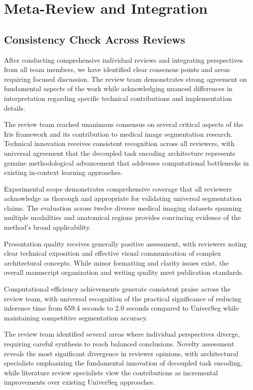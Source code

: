 \section*{Meta-Review and Integration}
\label{sec:meta_review}

\subsection*{Consistency Check Across Reviews}
After conducting comprehensive individual reviews and integrating perspectives from all team members, we have identified clear consensus points and areas requiring focused discussion. The review team demonstrates strong agreement on fundamental aspects of the work while acknowledging nuanced differences in interpretation regarding specific technical contributions and implementation details.

The review team reached unanimous consensus on several critical aspects of the Iris framework and its contribution to medical image segmentation research. Technical innovation receives consistent recognition across all reviewers, with universal agreement that the decoupled task encoding architecture represents genuine methodological advancement that addresses computational bottlenecks in existing in-context learning approaches.

Experimental scope demonstrates comprehensive coverage that all reviewers acknowledge as thorough and appropriate for validating universal segmentation claims. The evaluation across twelve diverse medical imaging datasets spanning multiple modalities and anatomical regions provides convincing evidence of the method's broad applicability.

Presentation quality receives generally positive assessment, with reviewers noting clear technical exposition and effective visual communication of complex architectural concepts. While minor formatting and clarity issues exist, the overall manuscript organization and writing quality meet publication standards.

Computational efficiency achievements generate consistent praise across the review team, with universal recognition of the practical significance of reducing inference time from 659.4 seconds to 2.0 seconds compared to UniverSeg while maintaining competitive segmentation accuracy.

The review team identified several areas where individual perspectives diverge, requiring careful synthesis to reach balanced conclusions. Novelty assessment reveals the most significant divergence in reviewer opinions, with architectural specialists emphasizing the fundamental innovation of decoupled task encoding, while literature review specialists view the contributions as incremental improvements over existing UniverSeg approaches.

